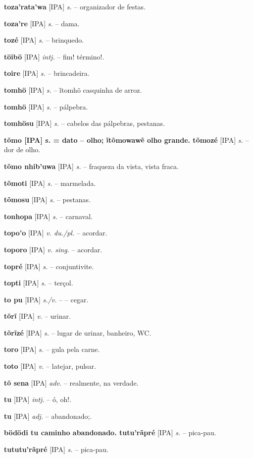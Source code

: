 \textbf{toza'rata'wa} [IPA] \textit{s.} -- organizador de festas.

\textbf{toza're} [IPA] \textit{s.} -- dama.

\textbf{tozé} [IPA] \textit{s.} -- brinquedo.

\textbf{töibö} [IPA] \textit{intj.} -- fim! término!.

\textbf{toire} [IPA] \textit{s.} -- brincadeira.

\textbf{tomhö} [IPA] \textit{s.} -- ĩtomhö casquinha de arroz.

\textbf{tomhö} [IPA] \textit{s.} -- pálpebra.

\textbf{tomhösu} [IPA] \textit{s.} -- cabelos das pálpebras, pestanas.

\textbf{tõmo [IPA] s. = dato -- olho; ĩtõmowawẽ olho grande. tõmozé} [IPA] \textit{s.} -- dor de olho.

\textbf{tõmo nhib'uwa} [IPA] \textit{s.} -- fraqueza da vista, vista fraca.

\textbf{tõmoti} [IPA] \textit{s.} -- marmelada.

\textbf{tõmosu} [IPA] \textit{s.} -- pestanas.

\textbf{tonhopa} [IPA] \textit{s.} -- carnaval.

\textbf{topo'o} [IPA] \textit{v. du./pl.} -- acordar.

\textbf{toporo} [IPA] \textit{v. sing.} -- acordar.

\textbf{topré} [IPA] \textit{s.} -- conjuntivite.

\textbf{topti} [IPA] \textit{s.} -- terçol.

\textbf{to pu} [IPA] \textit{s./v.} -- -- cegar.

\textbf{tõrĩ} [IPA] \textit{v.} -- urinar.

\textbf{tõrĩzé} [IPA] \textit{s.} -- lugar de urinar, banheiro, WC.

\textbf{toro} [IPA] \textit{s.} -- gula pela carne.

\textbf{toto} [IPA] \textit{v.} -- latejar, pulsar.

\textbf{tõ sena} [IPA] \textit{adv.} -- realmente, na verdade.

\textbf{tu} [IPA] \textit{intj.} -- ó, oh!.

\textbf{tu} [IPA] \textit{adj.} -- abandonado;.

\textbf{bödödi tu caminho abandonado. tutu'rãpré} [IPA] \textit{s.} -- pica-pau.

\textbf{tututu'rãpré} [IPA] \textit{s.} -- pica-pau.   %

